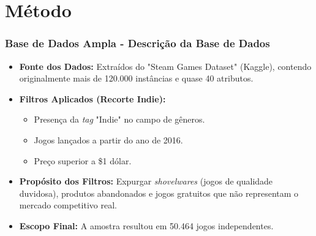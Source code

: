 \section{Método}
\begin{frame}
\frametitle{Base de Dados Ampla - Descrição da Base de Dados}
\justifying

\begin{itemize}
    \item \textbf{Fonte dos Dados:} Extraídos do "Steam Games Dataset" (Kaggle), contendo originalmente mais de 120.000 instâncias e quase 40 atributos.
    \vspace{0.2cm}

    \item \textbf{Filtros Aplicados (Recorte Indie):}
    \begin{itemize}
        \item Presença da \textit{tag} "Indie" no campo de gêneros.
        \item Jogos lançados a partir do ano de 2016.
        \item Preço superior a \$1 dólar.
    \end{itemize}
    \vspace{0.2cm}

    \item \textbf{Propósito dos Filtros:} Expurgar \textit{shovelwares} (jogos de qualidade duvidosa), produtos abandonados e jogos gratuitos que não representam o mercado competitivo real.
    \vspace{0.2cm}

    \item \textbf{Escopo Final:} A amostra resultou em 50.464 jogos independentes.
\end{itemize}    
\end{frame}
